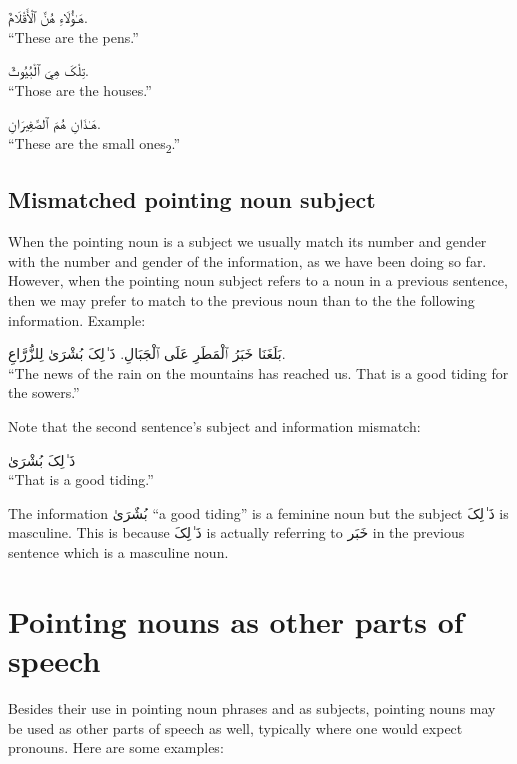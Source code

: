 \documentclass[
  10pt,
]{book}
\begin{document}
\foreignlanguage{arabic}{هَـٰؤُلَاءِ هُنَّ ٱلْأَقْلَامٌ.}\\
\enquote{These are the pens.}

\foreignlanguage{arabic}{تِلْکَ هِيَ ٱلْبُيُوتٌ.}\\
\enquote{Those are the houses.}

\foreignlanguage{arabic}{هَـٰذَانِ هُمَ ٱلصَّغِيرَانِ.}\\
\enquote{These are the small ones\textsubscript{2}.}

\subsection{Mismatched pointing noun subject}\label{mismatched-pointing-noun-subject}

When the pointing noun is a subject we usually match its number and gender with the number and gender of the information, as we have been doing so far. However, when the pointing noun subject refers to a noun in a previous sentence, then we may prefer to match to the previous noun than to the the following information. Example:

\foreignlanguage{arabic}{بَلَغَنَا خَبَرُ ٱلْمَطَرِ عَلَى ٱلْجَبَالِ. ذَ~ٰلِکَ بُشْرَىٰ لِلزُّرَّاعِ.}\\
\enquote{The news of the rain on the mountains has reached us. That is a good tiding for the sowers.}

Note that the second sentence's subject and information mismatch:

\foreignlanguage{arabic}{ذَ~ٰلِکَ بُشْرَىٰ}\\
\enquote{That is a good tiding.}

The information
\foreignlanguage{arabic}{بُشٌرَىٰ} \enquote{a good tiding} is a feminine noun but the subject
\foreignlanguage{arabic}{ذَ~ٰلِکَ} is masculine.
This is because
\foreignlanguage{arabic}{ذَ~ٰلِکَ}
is actually referring to \foreignlanguage{arabic}{خَبَر} in the previous sentence which is a masculine noun.

\section{Pointing nouns as other parts of speech}\label{pointing-nouns-as-other-parts-of-speech}

Besides their use in pointing noun phrases and as subjects, pointing nouns may be used as other parts of speech as well, typically where one would expect pronouns. Here are some examples:
\end{document}
